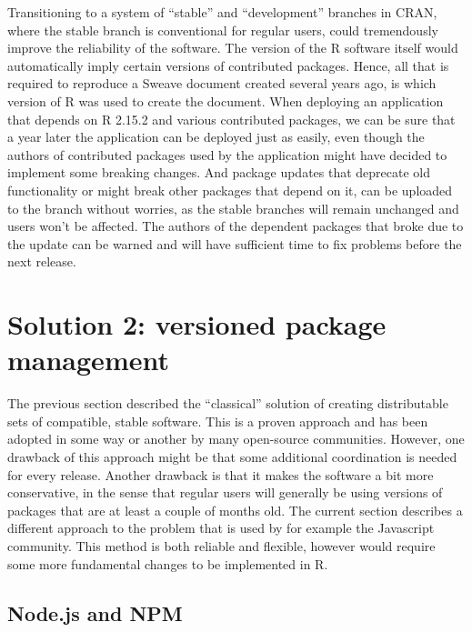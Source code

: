 Transitioning to a system of ``stable'' and ``development'' branches in CRAN,
where the stable branch is conventional for regular users, could tremendously
improve the reliability of the software. The version of the R software itself
would automatically imply certain versions of contributed packages. Hence, all
that is required to reproduce a Sweave document created several years ago, is
which version of R was used to create the document. When deploying an
application that depends on R 2.15.2 and various contributed packages, we can
be sure that a year later the application can be deployed just as easily, even
though the authors of contributed packages used by the application might have
decided to implement some breaking changes.
And package updates that deprecate old functionality or might break other
packages that depend on it, can be uploaded to the  branch
without worries, as the stable branches will remain unchanged and users won't
be affected. The authors of the dependent packages that broke due to the update
can be warned and will have sufficient time to fix problems before the next
 release.

\section{Solution 2: versioned package management}

The previous section described the ``classical'' solution of creating distributable
sets of compatible, stable software. This is a proven approach and has been
adopted in some way or another by many open-source communities. However, one
drawback of this approach might be that some additional coordination is needed
for every release. Another drawback is that it makes the software a bit
more conservative, in the sense that regular users will generally be using
versions of packages that are at least a couple of months old. The current
section describes a different approach to the problem that is used by for
example the Javascript community. This method is both reliable and flexible,
however would require some more fundamental changes to be implemented in R.

\subsection{Node.js and NPM}


